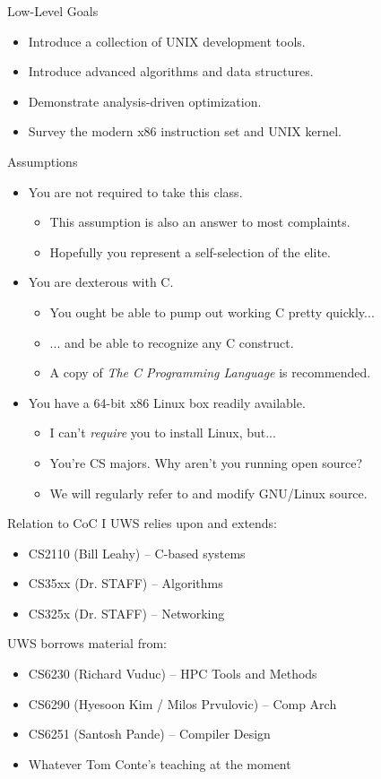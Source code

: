 \documentclass{beamer}
\begin{document}
\begin{frame}{Low-Level Goals}
\begin{itemize}
\item Introduce a collection of UNIX development tools.
\item Introduce advanced algorithms and data structures.
\item Demonstrate analysis-driven optimization.
\item Survey the modern x86 instruction set and UNIX kernel.
\end{itemize}
\end{frame}

\begin{frame}{Assumptions}
\begin{itemize}
\item You are not required to take this class.
\begin{itemize}
\item This assumption is also an answer to most complaints.
\item Hopefully you represent a self-selection of the elite.
\end{itemize}
\item You are dexterous with C.
\begin{itemize}
\item You ought be able to pump out working C pretty quickly...
\item ... and be able to recognize any C construct.
\item A copy of {\it The C Programming Language} is recommended.
\end{itemize}
\item You have a 64-bit x86 Linux box readily available.
\begin{itemize}
\item I can't {\it require} you to install Linux, but...
\item You're CS majors. Why aren't you running open source?
\item We will regularly refer to and modify GNU/Linux source.
\end{itemize}
\end{itemize}
\end{frame}

\begin{frame}{Relation to CoC I}
UWS relies upon and extends:
\begin{itemize}
\item CS2110 (Bill Leahy) -- C-based systems
\item CS35xx (Dr. STAFF) -- Algorithms
\item CS325x (Dr. STAFF) -- Networking
\end{itemize}
UWS borrows material from:
\begin{itemize}
\item CS6230 (Richard Vuduc) -- HPC Tools and Methods
\item CS6290 (Hyesoon Kim / Milos Prvulovic) -- Comp Arch
\item CS6251 (Santosh Pande) -- Compiler Design
\item Whatever Tom Conte's teaching at the moment
\end{itemize}
\end{frame}
\end{document}
